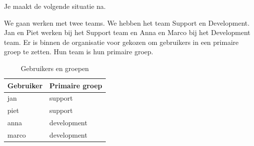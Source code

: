 Je maakt de volgende situatie na.

We gaan werken met twee teams. We hebben het team Support en Development. Jan en Piet werken bij het Support team en Anna en Marco bij het Development team. Er is binnen de organisatie voor gekozen om gebruikers in een primaire groep te zetten. Hun team is hun primaire groep.

\begin{flushleft}
\begin{table}[h!]
\centering
\begin{tabularx}{\textwidth}{ |X|X| }
\hline
Gebruiker & Primaire groep \\
\hline
jan & support \\
piet & support \\
anna & development \\
marco & development \\
\hline
\end{tabularx}
\caption{Gebruikers en groepen}
\label{table:gebruikers_groepen}
\end{table}
\end{flushleft}

